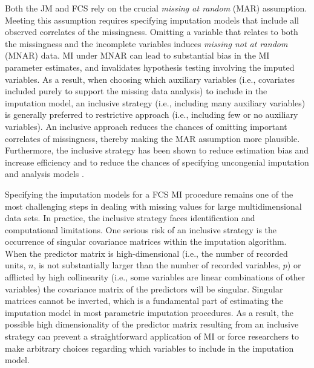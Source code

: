 Both the JM and FCS rely on the crucial \emph{missing at random} (MAR) assumption.
Meeting this assumption requires specifying imputation models that include all observed correlates of the missingness.
Omitting a variable that relates to both the missingness and the incomplete variables induces \emph{missing not at random} (MNAR) data.
MI under MNAR can lead to substantial bias in the MI parameter estimates, and 
invalidates hypothesis testing involving the imputed variables. As a result, when choosing which auxiliary variables (i.e., covariates included purely to support the missing data analysis) to include in the imputation model, 
an inclusive strategy (i.e., including many auxiliary variables) is generally preferred to restrictive approach 
(i.e., including few or no auxiliary variables).
An inclusive approach reduces the chances of omitting important correlates of missingness, thereby making the MAR assumption 
more plausible.
Furthermore, the inclusive strategy has been shown to reduce estimation bias and increase efficiency \citep{collinsEtAl:2001} and to
reduce the chances of specifying uncongenial imputation and analysis models \citep{meng:1994}.

Specifying the imputation models for a FCS MI procedure remains one of the most challenging steps in dealing
with missing values for large multidimensional data sets.
In practice, the inclusive strategy faces identification and computational limitations.
One serious risk of an inclusive strategy is the occurrence of singular covariance matrices within the imputation algorithm.
When the predictor matrix is high-dimensional (i.e., the number of recorded units, $n$, is not substantially larger than the number of recorded 
variables, $p$) or afflicted by high collinearity (i.e., some variables are linear combinations of other variables) the covariance matrix of the predictors will be singular.
Singular matrices cannot be inverted, which is a fundamental part of estimating the imputation 
model in most parametric imputation procedures.
As a result, the possible high dimensionality of the predictor matrix resulting from an inclusive strategy 
can prevent a straightforward application of MI or force researchers to make arbitrary choices 
regarding which variables to include in the imputation model.

